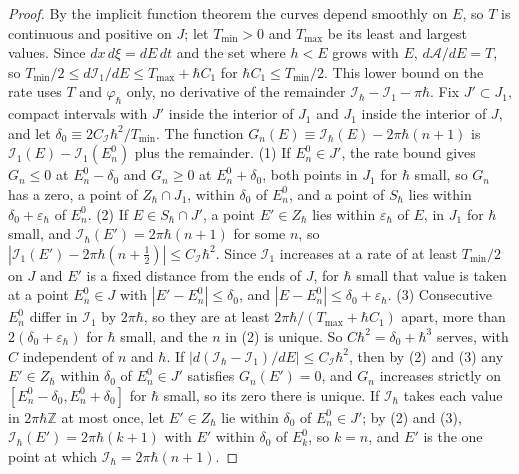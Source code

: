 \documentclass[aps,prd,onecolumn,tightenlines,nofootinbib,notitlepage,11pt,floatfix]{revtex4-2}
\theoremstyle{indentedtheorem}
\begin{document}
\begin{proof}
By the implicit function theorem the curves depend smoothly on $E$, so $T$ is continuous and positive on $J$; let $T_\text{min}>0$ and $T_\text{max}$ be its least and largest values. Since $dx\,d\xi=dE\,dt$ and the set where $h<E$ grows with $E$, $d\mathcal{A}/dE=T$, so $T_\text{min}/2\leq d\mathcal{I}_1/dE\leq T_\text{max}+\hbar C_1$ for $\hbar C_1\leq T_\text{min}/2$. This lower bound on the rate uses $T$ and $\varphi_\hbar$ only, no derivative of the remainder $\mathcal{I}_\hbar-\mathcal{I}_1-\pi\hbar$. Fix $J'\subset J_1$, compact intervals with $J'$ inside the interior of $J_1$ and $J_1$ inside the interior of $J$, and let $\delta_0\equiv2C_\mathcal{I}\hbar^2/T_\text{min}$. The function $G_n(E)\equiv\mathcal{I}_\hbar(E)-2\pi\hbar(n+1)$ is $\mathcal{I}_1(E)-\mathcal{I}_1(E_n^0)$ plus the remainder.
(1) If $E_n^0\in J'$, the rate bound gives $G_n\leq0$ at $E_n^0-\delta_0$ and $G_n\geq0$ at $E_n^0+\delta_0$, both points in $J_1$ for $\hbar$ small, so $G_n$ has a zero, a point of $Z_\hbar\cap J_1$, within $\delta_0$ of $E_n^0$, and a point of $S_\hbar$ lies within $\delta_0+\varepsilon_\hbar$ of $E_n^0$.
(2) If $E\in S_\hbar\cap J'$, a point $E'\in Z_\hbar$ lies within $\varepsilon_\hbar$ of $E$, in $J_1$ for $\hbar$ small, and $\mathcal{I}_\hbar(E')=2\pi\hbar(n+1)$ for some $n$, so $|\mathcal{I}_1(E')-2\pi\hbar(n+\tfrac{1}{2})|\leq C_\mathcal{I}\hbar^2$. Since $\mathcal{I}_1$ increases at a rate of at least $T_\text{min}/2$ on $J$ and $E'$ is a fixed distance from the ends of $J$, for $\hbar$ small that value is taken at a point $E_n^0\in J$ with $|E'-E_n^0|\leq\delta_0$, and $|E-E_n^0|\leq\delta_0+\varepsilon_\hbar$.
(3) Consecutive $E_n^0$ differ in $\mathcal{I}_1$ by $2\pi\hbar$, so they are at least $2\pi\hbar/(T_\text{max}+\hbar C_1)$ apart, more than $2(\delta_0+\varepsilon_\hbar)$ for $\hbar$ small, and the $n$ in (2) is unique.
So $C\hbar^2=\delta_0+\hbar^3$ serves, with $C$ independent of $n$ and $\hbar$. If $|d(\mathcal{I}_\hbar-\mathcal{I}_1)/dE|\leq C_\mathcal{I}\hbar^2$, then by (2) and (3) any $E'\in Z_\hbar$ within $\delta_0$ of $E_n^0\in J'$ satisfies $G_n(E')=0$, and $G_n$ increases strictly on $[E_n^0-\delta_0,E_n^0+\delta_0]$ for $\hbar$ small, so its zero there is unique. If $\mathcal{I}_\hbar$ takes each value in $2\pi\hbar\mathbb{Z}$ at most once, let $E'\in Z_\hbar$ lie within $\delta_0$ of $E_n^0\in J'$; by (2) and (3), $\mathcal{I}_\hbar(E')=2\pi\hbar(k+1)$ with $E'$ within $\delta_0$ of $E_k^0$, so $k=n$, and $E'$ is the one point at which $\mathcal{I}_\hbar=2\pi\hbar(n+1)$.
\end{proof}
\end{document}
